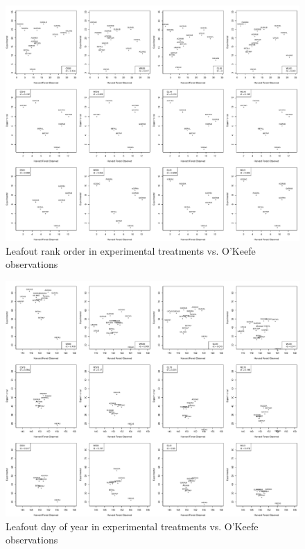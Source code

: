 \documentclass{article}
\begin{document}
\clearpage


\begin{figure}
\caption{Leafout rank order in experimental treatments vs. O'Keefe observations}
\label{figS11}
\includegraphics{leafout_exp_obs_corr}
\end{figure}

\begin{figure}
\caption{Leafout day of year in experimental treatments vs. O'Keefe observations}
\label{figS12}
\includegraphics{leafout_exp_obs_corr_day}
\end{figure}


%
%
\end{document}
